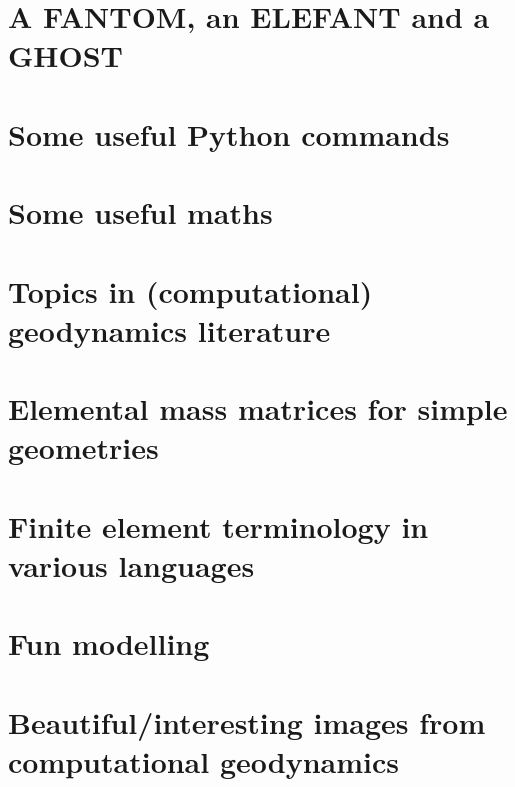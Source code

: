\documentclass[a4paper]{article}
\numberwithin{equation}{section}
\begin{document}
\section{A FANTOM, an ELEFANT and a GHOST}  %
\newpage %
\section{Some useful Python commands}  %
\newpage %
\section{Some useful maths}  \label{app_maths} %
\newpage %
\section{Topics in (computational) geodynamics literature}\label{app:topics}
\newpage %
\section{Elemental mass matrices for simple geometries}\label{app:mm} 
\newpage %
\section{Finite element terminology in various languages}  %
\newpage %
\section{Fun modelling}  %
\newpage %
\section{Beautiful/interesting images from computational geodynamics}%
\newpage %
\end{document}

